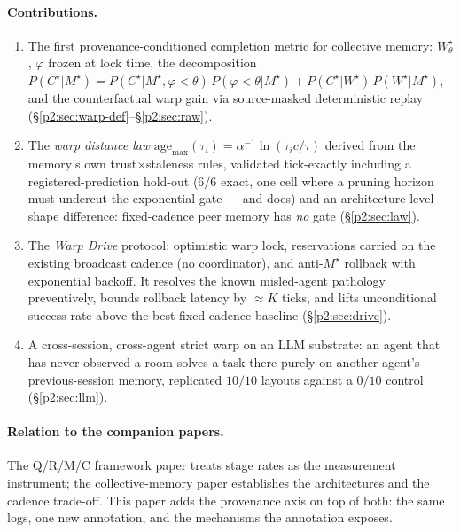 \documentclass{article}
\newcommand{\wstar}{W^{\star}}
\newcommand{\mstar}{M^{\star}}
\newcommand{\cstar}{C^{\star}}
\begin{document}
\paragraph{Contributions.}
\begin{enumerate}[leftmargin=20pt,itemsep=2pt,topsep=2pt]
\item The first provenance-conditioned completion metric for
  collective memory: $\wstar_\theta$, $\varphi$ frozen at lock time,
  the decomposition
  $P(\cstar|\mstar)=P(\cstar|\mstar,\varphi{<}\theta)\,P(\varphi{<}\theta|\mstar)
  + P(\cstar|\wstar)\,P(\wstar|\mstar)$, and the counterfactual warp
  gain via source-masked deterministic replay
  (\S\ref{p2:sec:warp-def}--\S\ref{p2:sec:raw}).
\item The \emph{warp distance law}
  $\mathrm{age}_{\max}(\tau_i)=\alpha^{-1}\ln(\tau_i c/\tau)$ derived
  from the memory's own trust$\times$staleness rules, validated
  tick-exactly including a registered-prediction hold-out ($6/6$
  exact, one cell where a pruning horizon must undercut the
  exponential gate --- and does) and an architecture-level shape
  difference: fixed-cadence peer memory has \emph{no} gate
  (\S\ref{p2:sec:law}).
\item The \emph{Warp Drive} protocol: optimistic warp lock,
  reservations carried on the existing broadcast cadence (no
  coordinator), and anti-$\mstar$ rollback with exponential backoff.
  It resolves the known misled-agent pathology preventively, bounds
  rollback latency by ${\approx}K$ ticks, and lifts unconditional
  success rate above the best fixed-cadence baseline
  (\S\ref{p2:sec:drive}).
\item A cross-session, cross-agent strict warp on an LLM substrate:
  an agent that has never observed a room solves a task there purely
  on another agent's previous-session memory, replicated $10/10$
  layouts against a $0/10$ control (\S\ref{p2:sec:llm}).
\end{enumerate}

\paragraph{Relation to the companion papers.}
The Q/R/M/C framework paper treats stage rates as the measurement
instrument; the collective-memory paper establishes the architectures
and the cadence trade-off. This paper adds the provenance axis on top
of both: the same logs, one new annotation, and the mechanisms the
annotation exposes. %
\end{document}
